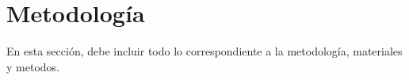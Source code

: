 \chapter{Metodología}

En esta sección, debe incluir todo lo correspondiente a la metodología, materiales y metodos.


